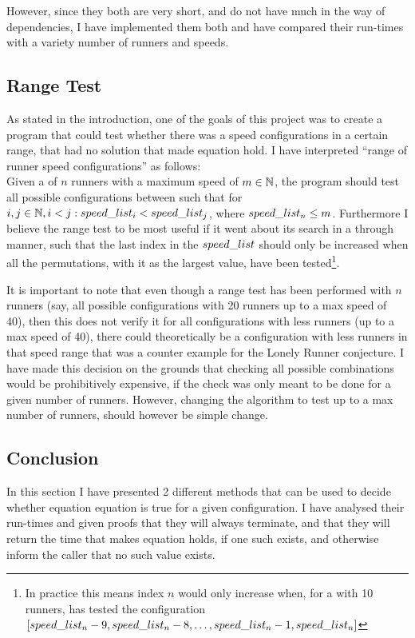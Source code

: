 However, since they both are very short, and do not have much in the way of dependencies, I have implemented them both and have compared their run-times with a variety number of runners and speeds.\\

\subsection{Range Test}
As stated in the introduction, one of the goals of this project was to create a program that could test whether there was a speed configurations in a certain range, that had no solution that made equation  hold. I have interpreted ``range of runner speed configurations'' as follows:\\

Given a \comS of $n$ runners with a maximum speed of $m \in \mathbb{N}$, the program should test all possible configurations between such that for $i, j \in \mathbb{N}, i < j: speed\_list_i < speed\_list_j$, where $speed\_list_n \leq m$. Furthermore I believe the range test to be most useful if it went about its search in a through manner, such that the last index in the $speed\_list$ should only be increased when all the permutations, with it as the largest value, have been tested\footnote{In practice this means index $n$ would only increase when, for a \comS with 10 runners, has tested the configuration $[speed\_list_n - 9, speed\_list_n - 8, \ldots, speed\_list_n - 1, speed\_list_n]$}. 

It is important to note that even though a range test has been performed with $n$ runners (say, all possible configurations with 20 runners up to a max speed of 40), then this does not verify it for all configurations with less runners (up to a max speed of 40), there could theoretically be a configuration with less runners in that speed range that was a counter example for the Lonely Runner conjecture. I have made this decision on the grounds that checking all possible combinations would be prohibitively expensive, if the check was only meant to be done for a given number of runners. However, changing the algorithm to test up to a max number of runners, should however be simple change. 


\subsection{Conclusion}
In this section I have presented 2 different methods that can be used to decide whether equation equation  is true for a given configuration. I have analysed their run-times and given proofs that they will always terminate, and that they will return the time that makes equation  holds, if one such exists, and otherwise inform the caller that no such value exists.

